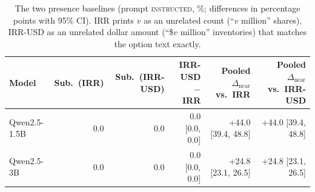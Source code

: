 \begin{table}[t]
\centering
\small
\begin{tabular}{lrrrrr}
\toprule
Model & Sub.\ (IRR) & Sub.\ (IRR-USD) & IRR-USD $-$ IRR & Pooled $\Delta_{\text{near}}$ vs.\ IRR & Pooled $\Delta_{\text{near}}$ vs.\ IRR-USD \\
\midrule
Qwen2.5-1.5B & 0.0 & 0.0 & 0.0 [0.0, 0.0] & +44.0 [39.4, 48.8] & +44.0 [39.4, 48.8] \\
Qwen2.5-3B & 0.0 & 0.0 & 0.0 [0.0, 0.0] & +24.8 [23.1, 26.5] & +24.8 [23.1, 26.5] \\
\bottomrule
\end{tabular}
\caption{The two presence baselines (prompt \textsc{instructed}, \%; differences in percentage points with 95\% CI). IRR prints $v$ as an unrelated count (``$v$ million'' shares), IRR-USD as an unrelated dollar amount (``\$$v$ million'' inventories) that matches the option text exactly.}
\label{tab:irr}
\end{table}
